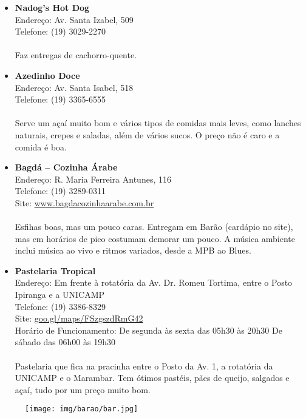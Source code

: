 \begin{itemize}
\item \textbf{Nadog's Hot Dog}
  \\Endereço: Av. Santa Izabel, 509
  \\Telefone: (19) 3029-2270
  \\
  \\Faz entregas de cachorro-quente.

\item \textbf{Azedinho Doce}
  \\Endereço: Av. Santa Isabel, 518
  \\Telefone: (19) 3365-6555
  \\
  \\Serve um açaí muito bom e vários tipos de comidas mais leves, como lanches
  naturais, crepes e saladas, além de vários sucos. O preço não é caro e a
  comida é boa.

\item \textbf{Bagdá -- Cozinha Árabe}
  \\Endereço: R. Maria Ferreira Antunes, 116
  \\Telefone: (19) 3289-0311
  \\Site: \url{www.bagdacozinhaarabe.com.br}
  \\
  \\Esfihas boas, mas um pouco caras. Entregam em Barão (cardápio no site), mas
  em horários de pico costumam demorar um pouco. A música ambiente inclui
  música ao vivo e ritmos variados, desde a MPB ao Blues.

\item \textbf{Pastelaria Tropical}
  \\Endereço: Em frente à rotatória da Av. Dr. Romeu Tortima,
  entre o Posto Ipiranga e a UNICAMP
  \\Telefone: (19) 3386-8329
  \\Site: \url{goo.gl/maps/FSzgszdRmG42}
  \\Horário de Funcionamento: De segunda às sexta das 05h30 às 20h30
  De sábado das 06h00 às 19h30
  \\
  \\ Pastelaria que fica na pracinha entre o Posto da Av. 1, a rotatória da UNICAMP
  e o Marambar. Tem ótimos pastéis, pães de queijo, salgados e açaí, tudo por um
  preço muito bom.
\end{itemize}

\begin{figure}[h!]
  \centering
  \texttt{[image: img/barao/bar.jpg]}
\end{figure}

